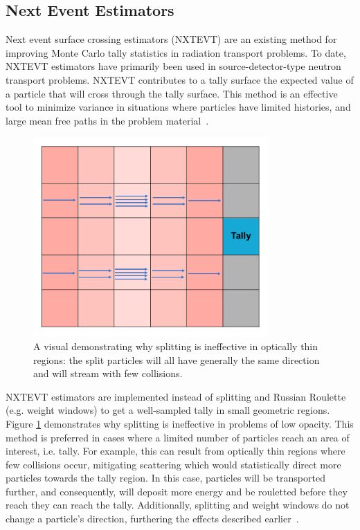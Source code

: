 \documentclass[]{article}
\begin{document}
	\subsection{Next Event Estimators}
Next event surface crossing estimators (NXTEVT) are an existing method for improving Monte Carlo tally statistics in radiation transport problems. To date, NXTEVT estimators have primarily been used in source-detector-type neutron transport problems. NXTEVT contributes to a tally surface the expected value of a particle that will cross through the tally surface. This method is an effective tool to minimize variance in situations where particles have limited histories, and large mean free paths in the problem material~\cite{WD11, LL99, LL05}. 
		
		\begin{figure} [h!]
			\centering
			\includegraphics[height=3in]{Figures/nxtevt_visual.png}
			\caption{A visual demonstrating why splitting is ineffective in optically thin regions: the split particles will all have generally the same direction and will stream with few collisions.}
			\label{fig:nxtevt_visual}
		\end{figure}
		
		NXTEVT estimators are implemented instead of splitting and Russian Roulette (e.g. weight windows) to get a well-sampled tally in small geometric regions. Figure \ref{fig:nxtevt_visual} demonstrates why splitting is ineffective in problems of low opacity. This method is preferred in cases where a limited number of particles reach an area of interest, i.e. tally. For example, this can result from optically thin regions where few collisions occur, mitigating scattering which would statistically direct more particles towards the tally region. In this case, particles will be transported further, and consequently, will deposit more energy and be rouletted before they reach they can reach the tally. Additionally, splitting and weight windows do not change a particle's direction, furthering the effects described earlier~\cite{BF12}.
		
\end{document}
